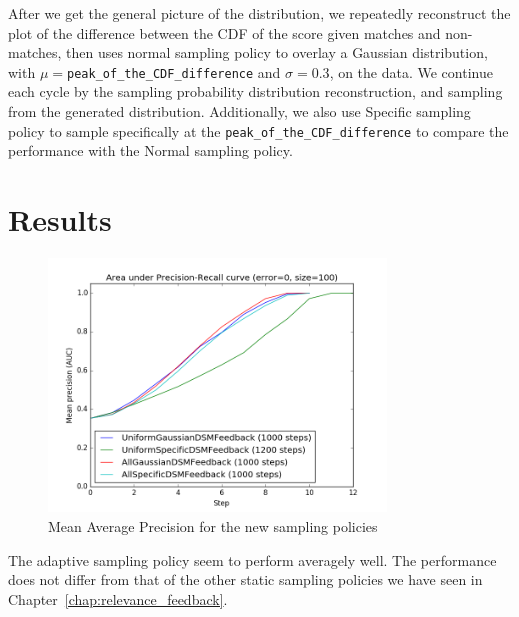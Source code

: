 After we get the general picture of the distribution, we repeatedly reconstruct
the plot of the difference between the CDF of the score given matches and
non-matches, then uses normal sampling policy to overlay a Gaussian
distribution, with $\mu=$\texttt{peak\_of\_the\_CDF\_difference} and
$\sigma=0.3$, on the data. We continue each cycle by the sampling probability
distribution reconstruction, and sampling from the generated distribution.
Additionally, we also use Specific sampling policy to sample specifically at the
\texttt{peak\_of\_the\_CDF\_difference} to compare the performance with the
Normal sampling policy.

\section{Results}

\begin{figure}[h!]
  \centering
  \includegraphics[width=0.8\textwidth]{otago}
  \caption{Mean Average Precision for the new sampling policies}
  \label{fig:otago_adaptive_aoc} %
\end{figure}

The adaptive sampling policy seem to perform averagely well. The performance
does not differ from that of the other static sampling policies we have seen in
Chapter~\ref{chap:relevance_feedback}.


